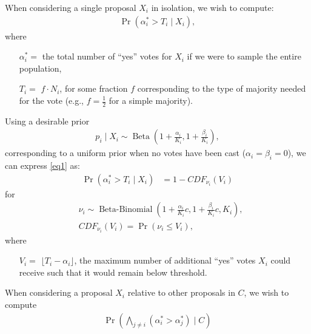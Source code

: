 \documentclass[chi_draft]{sigchi}
\begin{document}
When considering a single proposal $X_i$ in isolation, we wish to compute:
\begin{align}\label{eq1}
\Pr(\alpha^*_i > T_i \mid X_i),
\end{align}
where
\begin{description}
\begin{itemize}
\item[$\alpha^*_i = $] the total number of ``yes'' votes for $X_i$ if we were to sample the entire population,
\item[$T_i = $] $f \cdot N_i$, for some fraction $f$ corresponding to the type of majority needed for the vote
(e.g., $f=\frac{1}{2}$ for a simple majority).
\end{itemize}
\end{description}
Using a desirable prior 
\begin{align}\label{eq2}
p_i \mid X_i \sim \operatorname{Beta}(1+\frac{\alpha_i}{K_i},1+\frac{\beta_i}{K_i}),
\end{align}
corresponding to a uniform prior when no votes have been cast ($\alpha_i = \beta_i = 0$), we can express \eqref{eq1} as:
\begin{align}\label{eq3}
\Pr(\alpha^*_i > T_i \mid X_i) &= 1 - {CDF}_{\nu_i}(V_i)
\end{align}
for
\begin{align*}
&\nu_i \sim \operatorname{Beta-Binomial}(1 + \frac{\alpha_i}{K_i}c, 1 + \frac{\beta_i}{K_i}c, K_i),\\
&{CDF}_{\nu_i}(V_i)  = \Pr(\nu_i \leq V_i),
\end{align*}
where
\begin{description}
\begin{itemize}
\item[$V_i = $] $\lfloor{T_i - \alpha_i}\rfloor$, the maximum number of additional ``yes'' votes $X_i$ could receive such that it would remain below threshold.
\end{itemize}
\end{description}

When considering a proposal $X_i$ relative to other proposals in $C$, we wish to compute
\begin{align}\label{eq4}
\Pr\left(\bigwedge_{j \neq i} (\alpha^*_i > \alpha^*_j) \mid C\right)
\end{align}
\end{document}
